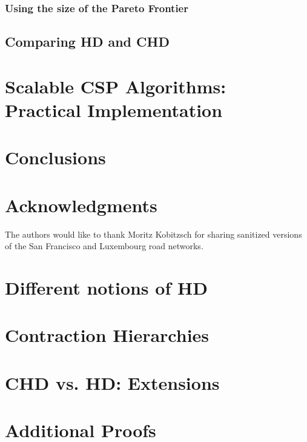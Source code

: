 \documentclass{vldb}
\begin{document}
\subsubsection{Using the size of the Pareto Frontier}


\subsection{Comparing HD and CHD}
\label{ssec:hdvschd}


\section{Scalable CSP Algorithms: \texorpdfstring{\\}{ } Practical Implementation}
\label{sec:numeric}


\section{Conclusions}


\balance

\section{Acknowledgments}

The authors would like to thank Moritz Kobitzsch for sharing sanitized versions of the San Francisco and Luxembourg road networks.


 


\begin{appendix}

\section{Different notions of HD}
\label{app:generalhd}


\section{Contraction Hierarchies}


\section{CHD vs. HD: Extensions}
\label{app:extn}



\section{Additional Proofs}
\label{sec:proofs}


\end{appendix}
\end{document}
